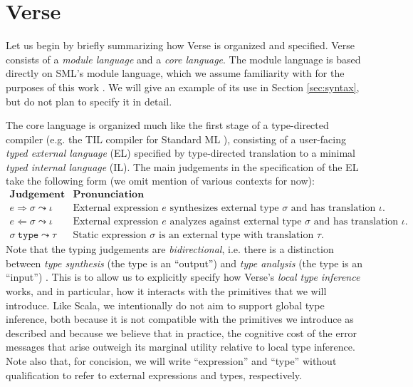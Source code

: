 \section{Verse}\label{sec:verse}
Let us begin by briefly summarizing how Verse is organized and specified. Verse consists of a \emph{module language} and a \emph{core language}. The module language is based directly on SML's module language,  which we assume familiarity with for the purposes of this work \cite{harper1997programming,MacQueen:1984:MSM:800055.802036}. We will give an example of its use in Section \ref{sec:syntax}, but do not plan to specify it in detail. 

The core language is organized much like the first stage of a type-directed compiler (e.g. the TIL compiler for Standard ML \cite{tarditi+:til-OLD}), consisting of a user-facing \emph{typed external language} (EL) specified by type-directed translation to a minimal \emph{typed internal language} (IL). The main judgements in the specification of the EL take the following form (we omit mention of various contexts for now):
\\[1ex]
$\begin{array}{ll}
\textbf{Judgement} & \textbf{Pronunciation}\\
e \Rightarrow \sigma \leadsto \iota & \text{External expression $e$ synthesizes external type $\sigma$ and has translation $\iota$.}\\
e \Leftarrow \sigma \leadsto \iota & \text{External expression $e$ analyzes against external type $\sigma$ and has translation $\iota$.}\\
\sigma~\mathtt{type} \leadsto \tau & \text{Static expression $\sigma$ is an external type with translation $\tau$.}
\end{array}
$\\[1ex]
Note that the typing judgements are \emph{bidirectional}, i.e. there is a distinction between \emph{type synthesis} (the type is an ``output'') and \emph{type analysis} (the type is an ``input'') \cite{Pierce:2000:LTI:345099.345100}. This is to  allow us to explicitly specify how Verse's \emph{local type inference} works, and in particular, how it interacts with the primitives that we will introduce. Like Scala, we intentionally do not aim to support global type inference, both because it is not compatible with the primitives we introduce as described and because we believe that in practice, the cognitive cost of the error messages that arise outweigh its marginal utility relative to local type inference. Note also that, for concision, we will write ``expression'' and ``type'' without qualification to refer to  external expressions and types, respectively.

